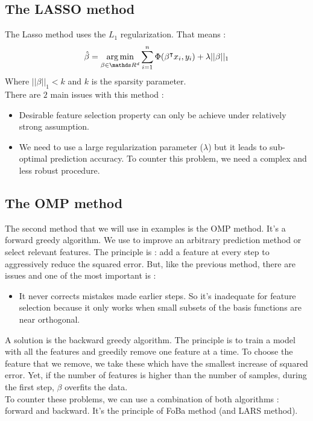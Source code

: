 \documentclass{article}
\begin{document}
\subsection{The LASSO method}
The Lasso method uses the $L_1$ regularization. That means :
\[\hat{\beta} = \underset{\beta \in \R^d}{\argmin} \sum_{i=1}^n \Phi (\trans{\beta}x_i, y_i)+ \lambda ||\beta||_1\]
Where $||\beta||_1<k$ and $k$ is the sparsity parameter.\\
There are $2$ main issues with this method : 
\begin{itemize}
    \item Desirable feature selection property can only be achieve under relatively strong assumption.
    \item We need to use a large regularization parameter ($\lambda$) but it leads to sub-optimal prediction accuracy. To counter this problem, we need a complex and less robust procedure.
\end{itemize}

\subsection{The OMP method}
The second method that we will use in examples is the OMP method. It's a forward greedy algorithm. We use to improve an arbitrary prediction method or select relevant features. The principle is : add a feature at every step to aggressively reduce the squared error. But, like the previous method, there are issues and one of the most important is :
\begin{itemize}
    \item It never corrects mistakes made earlier steps. So it's inadequate for feature selection because it only works when small subsets of the basis functions are near orthogonal.
\end{itemize}
A solution is the backward greedy algorithm. The principle is to train a model with all the features and greedily remove one feature at a time. To choose the feature that we remove, we take these which have the smallest increase of squared error. Yet, if the number of features is higher than the number of samples, during the first step, $\beta$ overfits the data.\\
To counter these problems, we can use a combination of both algorithms : forward and backward. It's the principle of FoBa method (and LARS method).
\end{document}
